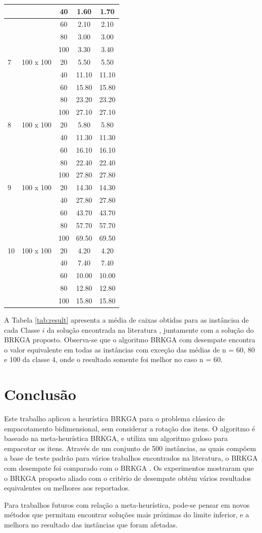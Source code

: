 \documentclass[article]{rian_article}
\begin{document}
\begin{longtable}{|l|c|c|c|c|}
	&  & 40 & 1.60 & 1.70 \\ \hline
	&  & 60 & 2.10 & 2.10 \\ \hline
	&  & 80 & 3.00 & 3.00 \\ \hline
	&  & 100 & 3.30 & 3.40 \\ \hline
	7 & 100 x 100 & 20 & 5.50 & 5.50 \\ \hline
	&  & 40 & 11.10 & 11.10 \\ \hline
	&  & 60 & 15.80 & 15.80 \\ \hline
	&  & 80 & 23.20 & 23.20 \\ \hline
	&  & 100 & 27.10 & 27.10 \\ \hline
	8 & 100 x 100 & 20 & 5.80 & 5.80 \\ \hline
	&  & 40 & 11.30 & 11.30 \\ \hline
	&  & 60 & 16.10 & 16.10 \\ \hline
	&  & 80 & 22.40 & 22.40 \\ \hline
	&  & 100 & 27.80 & 27.80 \\ \hline
	9 & 100 x 100 & 20 & 14.30 & 14.30 \\ \hline
	&  & 40 & 27.80 & 27.80 \\ \hline
	&  & 60 & 43.70 & 43.70 \\ \hline
	&  & 80 & 57.70 & 57.70 \\ \hline
	&  & 100 & 69.50 & 69.50 \\ \hline
	10 & 100 x 100 & 20 & 4.20 & 4.20 \\ \hline
	&  & 40 & 7.40 & 7.40 \\ \hline
	&  & 60 & 10.00 & 10.00 \\ \hline
	&  & 80 & 12.80 & 12.80 \\ \hline
	&  & 100 & 15.80 & 15.80 \\ \hline
\end{longtable}

A Tabela \ref{tab:result} apresenta a média de caixas obtidas para as instâncisa de cada Classe ${i}$ da solução encontrada na literatura \citep{resende2013}, juntamente com a solução do BRKGA proposto.
Observa-se que o algoritmo BRKGA com desempate encontra o valor equivalente em todas as instâncias com exceção das médias de {n} = 60, 80 e 100 da classe 4, onde o resultado somente foi melhor no caso {n} = 60.

\section{Conclusão}
Este trabalho aplicou a heurística BRKGA para o problema clássico de empacotamento bidimensional, sem considerar a rotação dos itens. O algoritmo é baseado na meta-heurística BRKGA, e utiliza um algoritmo guloso para empacotar os itens. Através de um conjunto de 500 instâncias, as quais compõem a base de teste padrão para vários trabalhos encontrados na literatura, o BRKGA com desempate foi comparado com o BRKGA \citet{resende2013}. Os experimentos mostraram que o BRKGA proposto aliado com o critério de desempate obtém vários resultados equivalentes ou melhores aos reportados.

Para trabalhos futuros com relação a meta-heurística, pode-se pensar em novos métodos que permitam encontrar soluções mais próximas do limite inferior, e a melhora no resultado das instâncias que foram afetadas.



\end{document}
